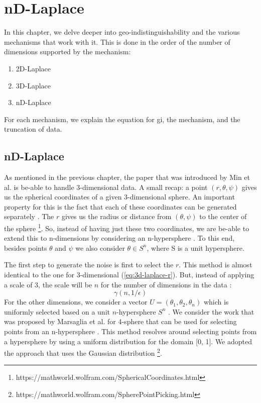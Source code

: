 \chapter{nD-Laplace}
In this chapter, we delve deeper into geo-indistinguishability and the various mechanisms that work with it.
This is done in the order of the number of dimensions supported by the mechanism:
\begin{enumerate}
  \item 2D-Laplace
  \item 3D-Laplace
  \item nD-Laplace
\end{enumerate}
For each mechanism, we explain the equation for \gls{gi}, the mechanism, and the truncation of data.



\newpage
\section{nD-Laplace}
As mentioned in the previous chapter, the paper that was introduced by Min et al. is be-able to handle 3-dimensional data.
A small recap: a point $(r, \theta, \psi)$ gives us the spherical coordinates of a given 3-dimensional sphere.
An important property for this is the fact that each of these coordinates can be generated separately \citep{DBLP:journals/corr/abs-1212-1984, 9646489}.
The $r$ gives us the radius or distance from $(\theta, \psi)$ to the center of the sphere \footnote{https://mathworld.wolfram.com/SphericalCoordinates.html}.
So, instead of having just these two coordinates, we are be-able to extend this to n-dimensions by considering an n-hypersphere \citep{fernandes_generalised_2019, 9646489}.
To this end, besides points $\theta$ and $\psi$ we also consider $\theta \in S^n$, where S is a unit hypersphere.

The first step to generate the noise is first to select the $r$.
This method is almost identical to the one for 3-dimensional (\ref{eq:3d-laplace-r}).
But, instead of applying a scale of 3, the scale will be $n$ for the number of dimensions in the data \citep{fernandes_generalised_2019}:
\begin{equation}
  \gamma(n, 1/\epsilon)
\end{equation}
For the other dimensions, we consider a vector $U = (\theta_1, \theta_2, \theta_n)$ which is uniformly selected based on a unit $n$-hypersphere $S^n$ \citep{fernandes_generalised_2019}.
We consider the work that was proposed by Marsaglia et al. for 4-sphere that can be used for selecting points from an n-hypersphere \citep{marsaglia_choosing_1972}.
This method resolves around selecting points from a hypersphere by using a uniform distribution for the domain [0, 1].
We adopted the approach that uses the Gaussian distribution \footnote{https://mathworld.wolfram.com/SpherePointPicking.html}.

